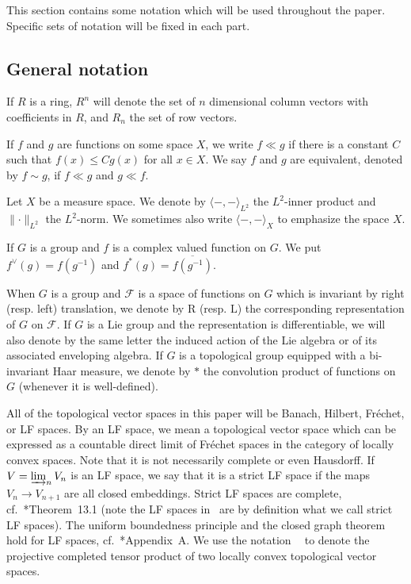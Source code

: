 \documentclass[letterpaper,11pt]{amsart}
\newcommand{\cF}{\mathcal{F}}
\newcommand{\<}{\negthickspace}
\providecommand{\aabs}[1]{\lVert#1\rVert}
\DeclareMathOperator{\otimeshat}{\widehat{\otimes}}
\theoremstyle{definition}
\theoremstyle{plain}
\theoremstyle{remark}
\numberwithin{equation}{section}
\begin{document}
This section contains some notation which will be used throughout the paper. Specific sets of notation will be fixed in each part.

\subsection{General notation}

If $R$ is a ring, $R^n$ will denote the set of $n$ dimensional column vectors
with coefficients in $R$, and $R_n$ the set of row vectors.


If $f$ and $g$ are functions on some space $X$, we write $f\ll g$ if there is a
constant $C$ such that $f(x) \leq C g(x)$ for all $x \in X$. We say $f$ and
$g$ are equivalent, denoted by $f \sim g$,  if $f\ll g$ and $g\ll f$.

Let $X$ be a measure space. We denote by $\langle-,-\rangle_{L^2}$ the $L^2$-inner product and $\aabs{\cdot}_{L^2}$ the $L^2$-norm. We sometimes also write $\langle-,-\rangle_X$ to emphasize the space $X$.

If $G$ is a group and $f$ is a complex valued function on $G$. We put $f^\vee(g) = f(g^{-1})$ and $f^*(g) = \overline{f(g^{-1})}$.

When $G$ is a group and $\cF$ is a space of functions on $G$ which is invariant by right
(resp. left) translation, we denote by $\mathrm{R}$ (resp. $\mathrm{L}$) the
corresponding representation of $G$ on $\cF$. If $G$ is a Lie group and the
representation is differentiable, we will also denote by the same letter the
induced action of the Lie algebra or of its associated enveloping algebra. If
$G$ is a topological group equipped with a bi-invariant Haar measure, we
denote by $*$ the convolution product of functions on $G$
(whenever it is well-defined).

All of the topological vector spaces in this paper will be Banach, Hilbert,
Fr\'{e}chet, or LF spaces. By an LF space, we mean a topological vector space which can be
expressed as a countable direct limit of Fr\'{e}chet spaces in the category of locally convex spaces. Note that it is not
necessarily complete or even Hausdorff. If $V = \varinjlim_n V_n$ is an LF space, we say that it is a strict LF space if the maps $V_n \to V_{n+1}$ are all closed embeddings.
Strict LF spaces are complete, cf.~\cite{Treves}*{Theorem~13.1} (note the LF
spaces in~\cite{Treves} are by definition what we call strict LF spaces).
The uniform boundedness principle and
the closed graph theorem hold for LF spaces, cf.~\cite{BPCZ}*{Appendix~A}. We
use the notation $\otimeshat$ to denote the projective completed tensor
product of two locally convex topological vector spaces.
\end{document}
